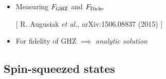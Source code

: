 \documentclass{beamer}
\newcommand{\citate}[1]{{\footnotesize{\color{gray}[ #1 ]}}

	}
\begin{document}
		\begin{frame}
			\begin{itemize}
				\item<1-> Measuring $F_{\rm GHZ}$ and $F_{\rm Dicke}$

				\citate{R. Augusiak {\it et al.}, arXiv:1506.08837 (2015)}
				\vspace{10px}

				\item<3-> For fidelity of GHZ $\implies$ \emph{\color{blue}analytic solution}
			\end{itemize}
		\end{frame}

	\subsection{Spin-squeezed states}
\end{document}

